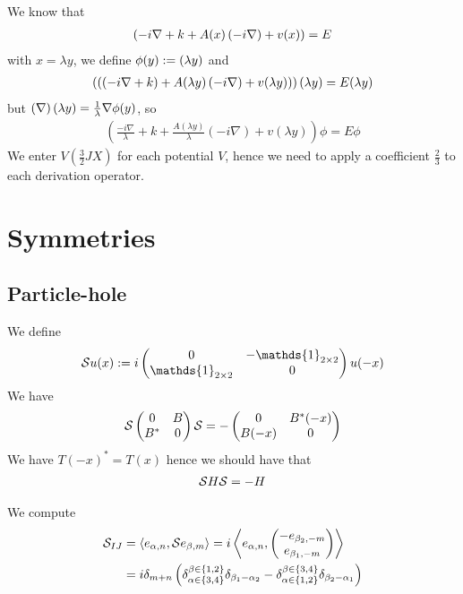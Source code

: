 \documentclass[11pt,a4paper,reqno,french,tikz]{amsart}
\newcommand{\pa}[1]{\left( #1 \right)} %
\newcommand{\acs}[1]{\left\{ #1 \right\}} %
\newcommand{\ps}[1]{\left< #1 \right>} %
\let\p\relax\newcommand{\p}{\psi} %
\newcommand{\na}{\nabla} %
\newcommand{\f}[2]{\frac{#1}{#2}} %
\newcommand{\mat}[1]{\begin{pmatrix} #1 \end{pmatrix}} %
\def\1{{\mathds{1}}}
\def\1{{\mathds{1}}}
\begin{document}
We know that
\begin{align*}
\pa{-i\na +k + A(x) \pa{-i\na} +v(x)} \p = E \p
\end{align*}
with $x=\lambda y$, we define $\phi(y) := \p(\lambda y)$ and
\begin{align*}
\pa{\pa{\pa{-i\na +k} + A(\lambda y) \pa{-i\na} +v(\lambda y)} \p}(\lambda y) = E \p(\lambda y)
\end{align*}
but $\pa{\na \p}(\lambda y) = \f{1}{\lambda} \na \phi(y)$, so
\begin{align*}
\pa{\f{-i\na}{\lambda}+k+ \f{A(\lambda y)}{\lambda} \pa{-i\na} + v(\lambda y)} \phi =   E \phi
\end{align*}
We enter $V\pa{\f{3}{2}J X}$ for each potential $V$, hence we need to apply a coefficient $\f{2}{3}$ to each derivation operator.



\section{Symmetries}%
\label{sec:symmetries}


\subsection{Particle-hole}%
\label{sub:particle_hole}

We define
\begin{align*}
\cS u(x) := i \mat{0 & -\1_{2\times 2} \\ \1_{2\times 2} & 0} u(-x)
\end{align*}
We have
\begin{align*}
\cS \mat{0 & B \\ B^* & 0} \cS = -\mat{0 & B^*(-x) \\ B(-x) & 0}
\end{align*}
We have $T(-x)^* = T(x)$ hence we should have that
\begin{align*}
\mathcal{S} H \mathcal{S} = - H
\end{align*}

We compute
\begin{align*}
	\cS_{IJ} &= \ps{e_{\alpha,n},\cS e_{\beta,m}} = i \ps{e_{\alpha,n}, \mat{-e_{\beta_2,-m} \\ e_{\beta_1,-m}}} \\
&= i \delta_{m+n} \pa{\delta_{\alpha \in \acs{3,4}}^{\beta \in \acs{1,2}} \delta_{\beta_1-\alpha_2} -\delta_{\alpha \in \acs{1,2}}^{\beta \in \acs{3,4}}\delta_{\beta_2-\alpha_1}}
\end{align*}
\end{document}
